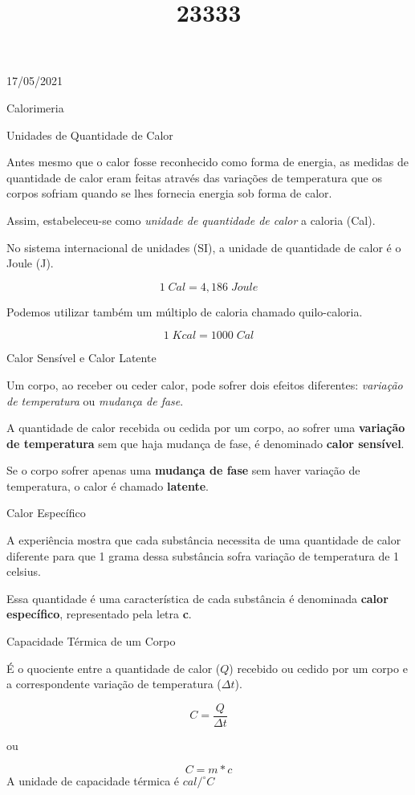 \documentclass{SchoolBook}
\begin{document}
    \begin{day}{17/05/2021}
        \title{2}{Calorimeria}
        \title{3}{Unidades de Quantidade de Calor}
        
        Antes mesmo que o calor fosse reconhecido como forma de energia, as medidas de quantidade de calor eram feitas através das variações de temperatura que os corpos sofriam quando se lhes fornecia energia sob forma de calor.
        
        Assim, estabeleceu-se como \emph{unidade de quantidade de calor} a caloria (Cal).
        
        No sistema internacional de unidades (SI), a unidade de quantidade de calor é o Joule (J).
        
        $$ 1\;Cal = 4,186\;Joule $$
        
         Podemos utilizar também um múltiplo de caloria chamado quilo-caloria.
         
         $$ 1\;Kcal = 1000\;Cal $$
         
         \title{3}{Calor Sensível e Calor Latente}
         
         Um corpo, ao receber ou ceder calor, pode sofrer dois efeitos diferentes: \emph{variação de temperatura} ou \emph{mudança de fase}.
         
         A quantidade de calor recebida ou cedida por um corpo, ao sofrer uma \textbf{variação de temperatura} sem que haja mudança de fase, é denominado \textbf{calor sensível}.
         
         Se o corpo sofrer apenas uma \textbf{mudança de fase} sem haver variação de temperatura, o calor é chamado \textbf{latente}.
         
         \title{3}{Calor Específico}
         
         A experiência mostra que cada substância necessita de uma quantidade de calor diferente para que 1 grama dessa substância sofra variação de temperatura de 1 celsius.
         
         Essa quantidade é uma característica de cada substância é denominada \textbf{calor específico}, representado pela letra \textbf{c}.
         
         \title{3}{Capacidade Térmica de um Corpo}
         
         É o quociente entre a quantidade de calor ($Q$) recebido ou cedido por um corpo e a correspondente variação de temperatura ($\Delta t$).
         
         $$ C = \frac{Q}{\Delta t} $$
         \begin{center}
            ou
         \end{center}
         $$ C = m * c $$
         A unidade de capacidade térmica é $cal/^\circ C$
         
    \end{day}
    
\end{document}
